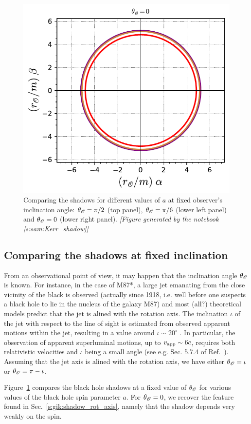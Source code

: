 \begin{figure}
\begin{center}
\includegraphics[height=0.28\textheight]{gik_shadow_comp_th00.pdf}
\end{center}
\caption[]{\label{f:gik:shadow_comp_th} \footnotesize
Comparing the shadows for different values of $a$ at fixed observer's inclination
angle: $\theta_{\mathscr{O}} = \pi/2$ (top panel),   $\theta_{\mathscr{O}} = \pi/6$ (lower left panel)
and $\theta_{\mathscr{O}} = 0$ (lower right panel).
\textsl{[Figure generated by the notebook \ref{s:sam:Kerr_shadow}]}
}
\end{figure}



\subsection{Comparing the shadows at fixed inclination}

From an observational point of view, it may happen that the inclination angle
$\theta_{\mathscr{O}}$ is known. For instance, in the case of M87*,
a large jet emanating from the close vicinity of the black is observed
(actually since 1918, i.e. well before one suspects a black hole to lie
in the nucleus of the galaxy M87)
and most (all?) theoretical models predict that the jet is alined with
the rotation axis. The inclination  $\iota$ of the jet with respect to the
line of sight is estimated from observed apparent motions within the jet,
resulting in a value around $\iota \sim 20^\circ$
\cite{MerteLWH16,WalkeHDLJ18}. In particular, the observation of
apparent superluminal motions, up to $v_{\rm app} \sim 6 c$, requires
both relativistic velocities and $\iota$ being a small angle (see e.g. Sec. 5.7.4 of Ref.~\cite{Gourg13}).
Assuming that the jet axis is alined with the rotation axis, we have either
$\theta_{\mathscr{O}} = \iota$ or $\theta_{\mathscr{O}} = \pi - \iota$.

Figure~\ref{f:gik:shadow_comp_th} compares the black hole shadows at a fixed
value of $\theta_{\mathscr{O}}$ for various values of the black hole spin parameter $a$.
For $\theta_{\mathscr{O}}=0$, we recover the feature found in Sec.~\ref{s:gik:shadow_rot_axis},
namely that the shadow depends very weakly on the spin.




